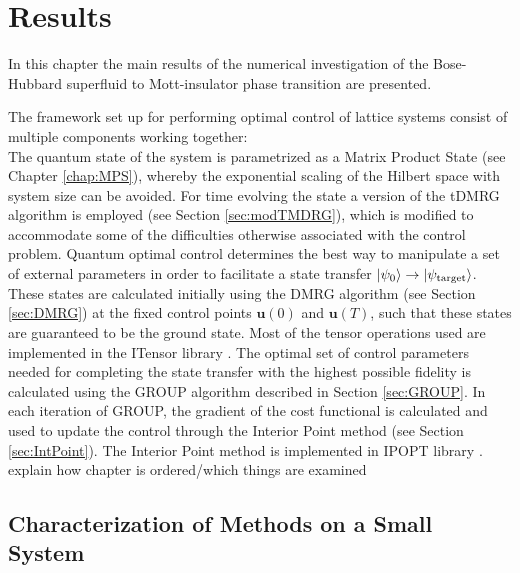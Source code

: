 \chapter{Results}

In this chapter the main results of the numerical investigation of the Bose-Hubbard superfluid to Mott-insulator phase transition are presented.

The framework set up for performing optimal control of lattice systems consist of multiple components working together:\\
The quantum state of the system is parametrized as a Matrix Product State (see Chapter \ref{chap:MPS}), whereby the exponential scaling of the Hilbert space with system size can be avoided. For time evolving the state a version of the tDMRG algorithm is employed (see Section \ref{sec:modTMDRG}), which is modified to accommodate some of the difficulties otherwise associated with the control problem.
Quantum optimal control determines the best way to manipulate a set of external parameters in order to facilitate a state transfer $\ket{\psi_0} \to \ket{\psi_{\mathrm{target}}}$. These states are calculated initially using the DMRG algorithm (see Section \ref{sec:DMRG}) at the fixed control points $\boldsymbol{u}(0)$ and $\boldsymbol{u}(T)$, such that these states are guaranteed to be the ground state. Most of the tensor operations used are implemented in the ITensor library \cite{ITensor}.
The optimal set of control parameters needed for completing the state transfer with the highest possible fidelity is calculated using the GROUP algorithm described in Section \ref{sec:GROUP}. In each iteration of GROUP, the gradient of the cost functional is calculated and used to update the control through the Interior Point method (see Section \ref{sec:IntPoint}). The Interior Point method is implemented in IPOPT library \cite{Wachter2006}.\\


explain how chapter is ordered/which things are examined



\section{Characterization of Methods on a Small System}

